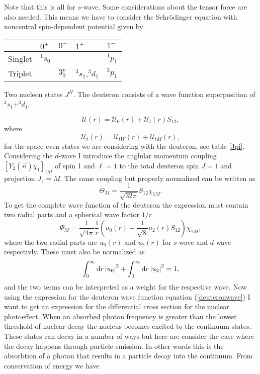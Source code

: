 Note that this is all for $s$-wave. Some considerations about the tensor force are also needed. This means we have to consider the Schrödinger equation with noncentral spin-dependent potential given by
\begin{margintable}
\label{Jpi}
\begin{tabular}{lllll}
\toprule
        & $0^+$     & $0^-$   & $1^+$           & $1^-$   \\ \midrule
Singlet & $^{1}s_0$ &         &                 & $^1p_1$ \\
Triplet &           & $3^p_0$ & $^3s_1$,$^3d_1$ & $^3p_1$
\end{tabular}
\caption{Two nucleon states $J^\Pi$. The deuteron consists of a wave function superposition of $^3 s_1+^3d_1$.}
\end{margintable}
\begin{equation}
    \mathcal{U}(r) = \mathcal{U}_0(r) + \mathcal{U}_t(r) S_{12},
\end{equation}
where
\begin{equation}
    \mathcal{U}_t (r) = \mathcal{U}_{tW}(r)+\mathcal{U}_{tM}(r),
\end{equation}
for the space-even states we are considering with the deuteron, see table \ref{Jpi}. Considering the $d$-wave I introduce the anglular momentum coupling $[Y_2(\vec{n})\chi_1]_{1M}$ of spin 1 and $\ell=1$ to the total deuteron spin $J=1$ and projection $J_z = M$. The same coupling but properly normalized can be written as
\begin{equation}
    \Theta_M = \frac{1}{\sqrt{32\pi}} S_{12}\chi_{1M}.
\end{equation}
To get the complete wave function of the deuteron the expression must contain two radial parts and a spherical wave factor $1/r$
\begin{equation}\label{deuteronwave}
    \Psi_M = \frac{1}{\sqrt{4\pi}} \frac{1}{r} \left( u_0(r)+\frac{1}{\sqrt{8}}u_2(r)S_{12}\right)\chi_{1M},
\end{equation}
where the two radial parts are $u_0(r)$ and $u_2(r)$ for $s$-wave and $d$-wave respectivly. These must also be normalized as
\begin{equation}
    \int_0^\infty \textrm{d}r \, \abs{u_0}^2 + \int_0^\infty \textrm{d}r \, \abs{u_2}^2 = 1,
\end{equation}
and the two terms can be interpreted as a weight for the respective wave. Now using the expression for the deuteron wave function equation (\ref{deuteronwave}) I want to get an expression for the differential cross section for the nuclear photoeffect. When an absorbed photon frequency is greater than the lowest threshold of nuclear decay the nucleus becomes excited to the continuum states. These states can decay in a number of ways but here are consider the case where the decay happens through particle emission. In other words this is the absorbtion of a photon that results in a particle decay into the continuum. From conservation of energy we have
